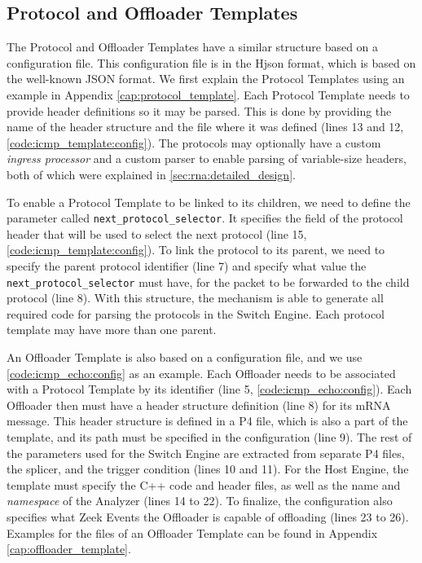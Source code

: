 \subsection{Protocol and Offloader Templates}

The Protocol and Offloader Templates have a similar structure based on a configuration file. This configuration file is in the Hjson \cite{Hjson} format, which is based on the well-known JSON format. We first explain the Protocol Templates using an example in Appendix \ref{cap:protocol_template}. Each Protocol Template needs to provide header definitions so it may be parsed. This is done by providing the name of the header structure and the file where it was defined (lines 13 and 12, \autoref{code:icmp_template:config}). The protocols may optionally have a custom \textit{ingress processor} and a custom parser to enable parsing of variable-size headers, both of which were explained in \autoref{sec:rna:detailed_design}.

To enable a Protocol Template to be linked to its children, we need to define the parameter called \texttt{next\_protocol\_selector}. It specifies the field of the protocol header that will be used to select the next protocol (line 15, \autoref{code:icmp_template:config}). To link the protocol to its parent, we need to specify the parent protocol identifier (line 7) and specify what value the \texttt{next\_protocol\_selector} must have, for the packet to be forwarded to the child protocol (line 8). With this structure, the mechanism is able to generate all required code for parsing the protocols in the Switch Engine. Each protocol template may have more than one parent.

An Offloader Template is also based on a configuration file, and we use \autoref{code:icmp_echo:config} as an example. Each Offloader needs to be associated with a Protocol Template by its identifier (line 5, \autoref{code:icmp_echo:config}). Each Offloader then must have a header structure definition (line 8) for its mRNA message. This header structure is defined in a P4 file, which is also a part of the template, and its path must be specified in the configuration (line 9). The rest of the parameters used for the Switch Engine are extracted from separate P4 files, the splicer, and the trigger condition (lines 10 and 11). For the Host Engine, the template must specify the C++ code and header files, as well as the name and \textit{namespace} of the Analyzer (lines 14 to 22). To finalize, the configuration also specifies what Zeek Events the Offloader is capable of offloading (lines 23 to 26). Examples for the files of an Offloader Template can be found in Appendix \ref{cap:offloader_template}.

